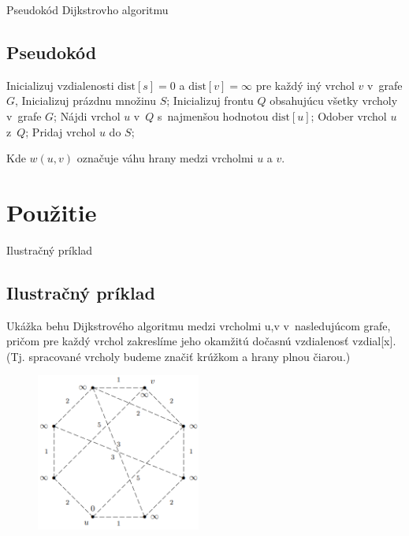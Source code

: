 \documentclass[15pt]{beamer}
\begin{document}
\begin{frame}{Pseudokód Dijkstrovho algoritmu}
	\subsection{Pseudokód}
	\begin{algorithm}[H]
		\SetAlgoLined
		Inicializuj vzdialenosti $\mathrm{dist}[s] = 0$ a $\mathrm{dist}[v] = \infty$ pre každý iný vrchol $v$ v~grafe $G$, Inicializuj prázdnu množinu $S$;\newline
		Inicializuj frontu $Q$ obsahujúcu všetky vrcholy v~grafe $G$; \newline
		{
			Nájdi vrchol $u$ v~$Q$ s~najmenšou hodnotou $\mathrm{dist}[u]$;\newline
			Odober vrchol $u$ z~$Q$; \newline
			Pridaj vrchol $u$ do $S$; \newline
		}
	\end{algorithm}
	Kde $w(u,v)$ označuje váhu hrany medzi vrcholmi $u$ a $v$.
\end{frame}

\section{Použitie}
\begin{frame}{Ilustračný príklad}
	\subsection{Ilustračný príklad}
	Ukážka behu Dijkstrového algoritmu medzi vrcholmi u,v v~nasledujúcom grafe, pričom pre každý vrchol zakreslíme jeho okamžitú dočasnú vzdialenosť vzdial[x]. (Tj. spracované vrcholy budeme
	značiť krúžkom a hrany plnou čiarou.)
	\begin{figure}
		\centering
		\includegraphics[width=0.48\textwidth]{imgs/dijkstra1.png}
		\label{fig:dijkstra1}
	\end{figure}
\end{frame}
\end{document}
